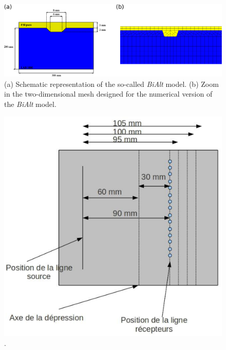 \documentclass[manuscript,revised]{geophysics}
\begin{document}
\begin{figure}[!h]
	\centering
	\includegraphics[scale=0.4]{fig/panel_bialt_model.eps}
	\caption{(a) Schematic representation of the so-called \textit{BiAlt} model. (b) Zoom in the two-dimensional mesh designed for the numerical version of the \textit{BiAlt} model.}
	\label{panel_bialt_model}
\end{figure}

\begin{figure}[!h]
	\centering
	\includegraphics[scale=0.4]{fig/amplitude_acqui_principle.eps}
	\caption{.}
	\label{amplitude_acqui_principle}
\end{figure}
\end{document}
